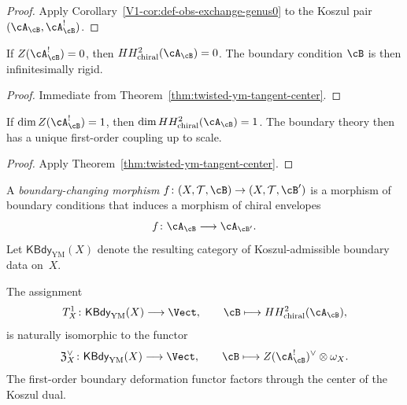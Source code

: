 \begin{proof}
Apply Corollary~\ref{V1-cor:def-obs-exchange-genus0} to the Koszul pair
$(\cA_{\cB}, \cA_{\cB}^!)$.
\end{proof}

\begin{corollary}
\label{cor:twisted-ym-center-rigidity}
If $Z(\cA_{\cB}^!) = 0$, then $HH^2_{\mathrm{chiral}}(\cA_{\cB}) = 0$.
The boundary condition $\cB$ is then infinitesimally rigid.
\end{corollary}

\begin{proof}
Immediate from Theorem~\ref{thm:twisted-ym-tangent-center}.
\end{proof}

\begin{corollary}
\label{cor:twisted-ym-one-parameter}
If $\dim Z(\cA_{\cB}^!) = 1$, then $\dim HH^2_{\mathrm{chiral}}(\cA_{\cB}) = 1$.
The boundary theory then has a unique first-order coupling up to scale.
\end{corollary}

\begin{proof}
Apply Theorem~\ref{thm:twisted-ym-tangent-center}.
\end{proof}

\begin{definition}
\label{def:twisted-ym-boundary-morphism}
A \emph{boundary-changing morphism}
$f \colon (X,\mathcal{T},\cB) \to (X,\mathcal{T},\cB')$
is a morphism of boundary conditions that induces a morphism of chiral envelopes
\[
f \colon \cA_{\cB} \longrightarrow \cA_{\cB'}.
\]
Let $\mathsf{KBdy}_{\mathrm{YM}}(X)$ denote the resulting category of Koszul-admissible
boundary data on~$X$.
\end{definition}

\begin{theorem}
\label{thm:twisted-ym-tangent-factors-through-center}
The assignment
\[
T^1_X \colon \mathsf{KBdy}_{\mathrm{YM}}(X) \longrightarrow \Vect,
\qquad
\cB \longmapsto HH^2_{\mathrm{chiral}}(\cA_{\cB}),
\]
is naturally isomorphic to the functor
\[
\mathfrak{Z}^{\vee}_{X} \colon \mathsf{KBdy}_{\mathrm{YM}}(X) \longrightarrow \Vect,
\qquad
\cB \longmapsto Z(\cA_{\cB}^!)^{\vee} \otimes \omega_X.
\]
The first-order boundary deformation functor factors through the center of
the Koszul dual.
\end{theorem}


